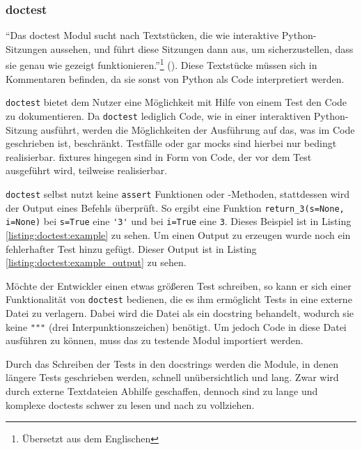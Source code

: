 \subsubsection{doctest}\label{python-tools:doctest}
"`Das doctest Modul sucht nach Textstücken, die wie interaktive Python-Sitzungen
aussehen, und führt diese Sitzungen dann aus, um sicherzustellen, dass sie genau
wie gezeigt funktionieren."'\footnote{Übersetzt aus dem Englischen}
(\cite{docs.python:doctest}). Diese Textstücke müssen sich in Kommentaren
befinden, da sie sonst von Python als Code interpretiert werden.
\newline

\lstinline{doctest} bietet dem Nutzer eine Möglichkeit mit Hilfe von einem Test
den Code zu dokumentieren. Da \lstinline{doctest} lediglich Code, wie in einer
interaktiven Python-Sitzung ausführt, werden die Möglichkeiten der Ausführung
auf das, was im Code geschrieben ist, beschränkt. Testfälle oder gar
\Glspl{mock} sind hierbei nur bedingt realisierbar. \Glspl{fixture} hingegen
sind in Form von Code, der vor dem Test ausgeführt wird, teilweise realisierbar.

\lstinline{doctest} selbst nutzt keine \lstinline{assert} Funktionen oder
-Methoden, stattdessen wird der Output eines Befehls überprüft. So ergibt eine
Funktion \lstinline{return_3(s=None, i=None)} bei \lstinline{s=True} eine
\lstinline{'3'} und bei \lstinline{i=True} eine \lstinline{3}. Dieses Beispiel 
ist in Listing \ref{listing:doctest:example} zu sehen. Um einen Output zu 
erzeugen wurde noch ein fehlerhafter Test hinzu gefügt. Dieser Output ist in 
Listing \ref{listing:doctest:example_output} zu sehen.

Möchte der Entwickler einen etwas größeren Test schreiben, so kann er sich einer
Funktionalität von \lstinline{doctest} bedienen, die es ihm ermöglicht Tests in
eine externe Datei zu verlagern. Dabei wird die Datei als ein \Gls{docstring}
behandelt, wodurch sie keine \lstinline{"""} (drei Interpunktionszeichen) 
benötigt. Um jedoch Code in diese Datei ausführen zu können, muss das zu 
testende Modul importiert werden.

Durch das Schreiben der Tests in den \Glspl{docstring} werden die Module, in
denen längere Tests geschrieben werden, schnell unübersichtlich und lang.
Zwar wird durch externe Textdateien Abhilfe geschaffen, dennoch sind zu lange 
und komplexe doctests schwer zu lesen und nach zu vollziehen.
\newline

